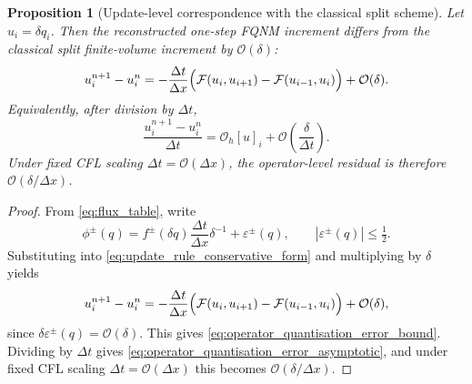 \documentclass[10pt,a4paper]{amsart}
\newtheorem{proposition}{Proposition}
\begin{document}
 \begin{proposition}[Update-level correspondence with the classical split scheme]
\label{prop:operator_quantisation_error}
Let $u_i=\delta q_i$. Then the reconstructed one-step FQNM increment differs from the classical split finite-volume increment by $\mathcal O(\delta)$:
\begin{equation}
u_i^{n+1}-u_i^n
= -\frac{\Delta t}{\Delta x}\Bigl(\mathcal F(u_i,u_{i+1})-\mathcal F(u_{i-1},u_i)\Bigr)
+ \mathcal O(\delta).
\label{eq:operator_quantisation_error_bound}
\end{equation}
Equivalently, after division by $\Delta t$,
\begin{equation}
\frac{u_i^{n+1}-u_i^n}{\Delta t}
= \mathcal O_h[u]_i + \mathcal O\!\left(\frac{\delta}{\Delta t}\right).
\label{eq:operator_quantisation_error_asymptotic}
\end{equation}
Under fixed CFL scaling $\Delta t=\mathcal O(\Delta x)$, the operator-level residual is therefore $\mathcal O(\delta/\Delta x)$.
\end{proposition}

\begin{proof}
From \cref{eq:flux_table}, write
\[
\phi^\pm(q)= f^\pm(\delta q)\frac{\Delta t}{\Delta x}\delta^{-1}+\varepsilon^\pm(q),
\qquad |\varepsilon^\pm(q)|\le \tfrac12.
\]
Substituting into \cref{eq:update_rule_conservative_form} and multiplying by $\delta$ yields
\[
u_i^{n+1}-u_i^n
= -\frac{\Delta t}{\Delta x}\Bigl(\mathcal F(u_i,u_{i+1})-\mathcal F(u_{i-1},u_i)\Bigr)
+ \mathcal O(\delta),
\]
since $\delta\varepsilon^\pm(q)=\mathcal O(\delta)$. This gives \cref{eq:operator_quantisation_error_bound}. Dividing by $\Delta t$ gives \cref{eq:operator_quantisation_error_asymptotic}, and under fixed CFL scaling $\Delta t=\mathcal O(\Delta x)$ this becomes $\mathcal O(\delta/\Delta x)$.

\end{proof}
\end{document}

